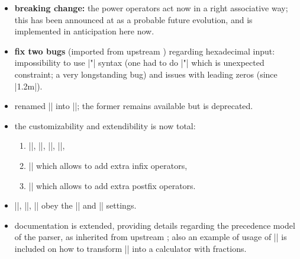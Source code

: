 \item[1.5 (2021/05/17)]
  \begin{itemize}
  \item \textbf{breaking change:} the power operators act now in a right
    associative way; this has been announced at \xintexprname as a probable
    future evolution, and is implemented in anticipation here now.
  \item \textbf{fix two bugs} (imported from upstream \xintexprname) regarding
    hexadecimal input: impossibility to use |"\foo| syntax (one had to do
    |\expandafter"\foo| which is unexpected constraint; a very longstanding
    \xintexprname bug) and issues with leading zeros (since \xintexprname |1.2m|).
  \item renamed |\bnumexprsetup| into |\bnumsetup|; the former remains
    available but is deprecated.
  \item the customizability and extendibility is now total:
    \begin{enumerate}
      \item |\bnumprintone|, |\bnumprintonetohex|, |\bnumprintonesep|, |\bnumhextodec|,
      \item |\bnumdefinfix| which allows to add extra infix operators,
      \item |\bnumdefpostfix| which allows to add extra postfix operators.
    \end{enumerate}
  \item |\bnumsetup|, |\bnumdefinfix|, |\bnumdefpostfix| obey the
    |\xintglobaldefstrue| and |\xintverbosetrue| settings.
  \item documentation is extended, providing details regarding the precedence
    model of the parser, as inherited from upstream \xintexprname; also an
    example of usage of |\bnumsetup| is included on how to transform
    |\bnumeval| into a calculator with fractions.
  \end{itemize}

